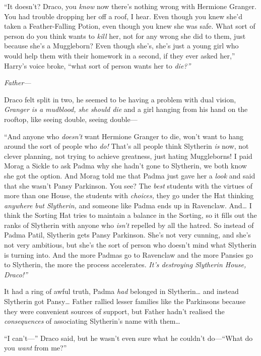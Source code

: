 ``It doesn't? Draco, you \emph{know} now there's nothing wrong with
Hermione Granger. You had trouble dropping her off a roof, I hear. Even
though you knew she'd taken a Feather-Falling Potion, even though you
knew she was safe. What sort of person do you think wants to \emph{kill}
her, not for any wrong she did to them, just because she's a Muggleborn?
Even though she's, she's just a young girl who would help them with
their homework in a second, if they ever asked her,'' Harry's voice
broke, ``what sort of person wants her to \emph{die?''}

\emph{Father---}

Draco felt split in two, he seemed to be having a problem with dual
vision, \emph{Granger is a mudblood, she should die} and a girl hanging
from his hand on the rooftop, like seeing double, seeing double---

``And anyone who \emph{doesn't} want Hermione Granger to die, won't want
to hang around the sort of people who \emph{do!} That's all people think
Slytherin \emph{is} now, not clever planning, not trying to achieve
greatness, just hating Muggleborns! I paid Morag a Sickle to ask Padma
why she hadn't gone to Slytherin, we both know she got the option. And
Morag told me that Padma just gave her a \emph{look} and said that she
wasn't Pansy Parkinson. You see? The \emph{best} students with the
virtues of more than one House, the students with \emph{choices,} they
go under the Hat thinking \emph{anywhere but Slytherin,} and someone
like Padma ends up in Ravenclaw. And\ldots{} I think the Sorting Hat
tries to maintain a balance in the Sorting, so it fills out the ranks of
Slytherin with anyone who \emph{isn't} repelled by all the hatred. So
instead of Padma Patil, Slytherin gets Pansy Parkinson. She's not very
cunning, and she's not very ambitious, but she's the sort of person who
doesn't mind what Slytherin is turning into. And the more Padmas go to
Ravenclaw and the more Pansies go to Slytherin, the more the process
accelerates. \emph{It's destroying Slytherin House, Draco!''}

It had a ring of awful truth, Padma \emph{had} belonged in
Slytherin\ldots{} and instead Slytherin got Pansy\ldots{} Father rallied
lesser families like the Parkinsons because they were convenient sources
of support, but Father hadn't realised the \emph{consequences} of
associating Slytherin's name with them\ldots{}

``I can't---'' Draco said, but he wasn't even sure what he couldn't
do---``What do you \emph{want} from me?''

